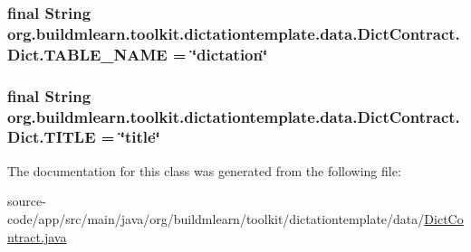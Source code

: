 \subsubsection[{\texorpdfstring{T\+A\+B\+L\+E\+\_\+\+N\+A\+ME}{TABLE_NAME}}]{\setlength{\rightskip}{0pt plus 5cm}final String org.\+buildmlearn.\+toolkit.\+dictationtemplate.\+data.\+Dict\+Contract.\+Dict.\+T\+A\+B\+L\+E\+\_\+\+N\+A\+ME = \char`\"{}dictation\char`\"{}\hspace{0.3cm}{\ttfamily [static]}}\hypertarget{classorg_1_1buildmlearn_1_1toolkit_1_1dictationtemplate_1_1data_1_1DictContract_1_1Dict_a2bd71896773218ddf46d5d567f00950b}{}\label{classorg_1_1buildmlearn_1_1toolkit_1_1dictationtemplate_1_1data_1_1DictContract_1_1Dict_a2bd71896773218ddf46d5d567f00950b}
\subsubsection[{\texorpdfstring{T\+I\+T\+LE}{TITLE}}]{\setlength{\rightskip}{0pt plus 5cm}final String org.\+buildmlearn.\+toolkit.\+dictationtemplate.\+data.\+Dict\+Contract.\+Dict.\+T\+I\+T\+LE = \char`\"{}title\char`\"{}\hspace{0.3cm}{\ttfamily [static]}}\hypertarget{classorg_1_1buildmlearn_1_1toolkit_1_1dictationtemplate_1_1data_1_1DictContract_1_1Dict_aa64523b372feca9a4ebff43f44d0b4c4}{}\label{classorg_1_1buildmlearn_1_1toolkit_1_1dictationtemplate_1_1data_1_1DictContract_1_1Dict_aa64523b372feca9a4ebff43f44d0b4c4}


The documentation for this class was generated from the following file\+:\begin{DoxyCompactItemize}
\item 
source-\/code/app/src/main/java/org/buildmlearn/toolkit/dictationtemplate/data/\hyperlink{DictContract_8java}{Dict\+Contract.\+java}\end{DoxyCompactItemize}
